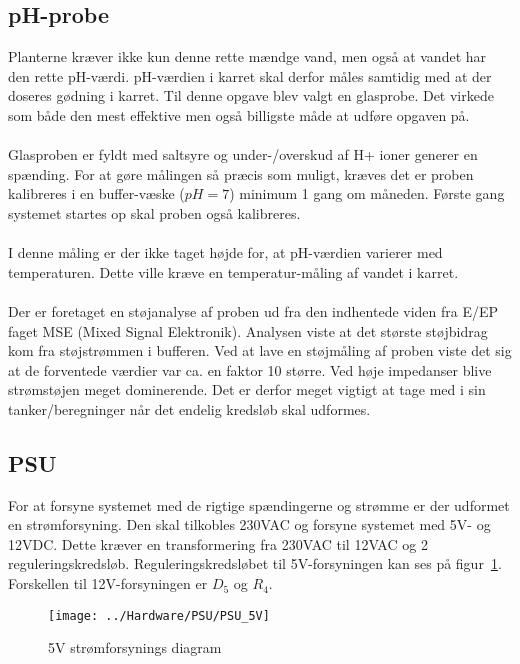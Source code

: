 \subsection{pH-probe}
Planterne kræver ikke kun denne rette mændge vand, men også at vandet har den rette pH-værdi. pH-værdien i karret skal derfor måles samtidig med at der doseres gødning i karret. Til denne opgave blev valgt en glasprobe. Det virkede som både den mest effektive men også billigste måde at udføre opgaven på.
\\\\
Glasproben er fyldt med saltsyre og under-/overskud af H+ ioner generer en spænding. For at gøre målingen så præcis som muligt, kræves det er proben kalibreres i en buffer-væske ($pH = 7$) minimum 1 gang om måneden. Første gang systemet startes op skal proben også kalibreres. 
\\\\
I denne måling er der ikke taget højde for, at pH-værdien varierer med temperaturen. Dette ville kræve en temperatur-måling af vandet i karret.
\\\\
Der er foretaget en støjanalyse af proben ud fra den indhentede viden fra E/EP faget MSE (Mixed Signal Elektronik). Analysen viste at det største støjbidrag kom fra støjstrømmen i bufferen. Ved at lave en støjmåling af proben viste det sig at de forventede værdier var ca. en faktor 10 større. Ved høje impedanser blive strømstøjen meget dominerende. Det er derfor meget vigtigt at tage med i sin tanker/beregninger når det endelig kredsløb skal udformes.

\subsection{PSU}
For at forsyne systemet med de rigtige spændingerne og strømme er der udformet en strømforsyning. Den skal tilkobles 230VAC og forsyne systemet med 5V- og 12VDC. Dette kræver en transformering fra 230VAC til 12VAC og 2 reguleringskredsløb. Reguleringskredsløbet til 5V-forsyningen kan ses på figur~\ref{photo:PSU_5V}. Forskellen til 12V-forsyningen er $D_5$ og $R_4$.
 
\begin{figure}[H]
	\centering
	\texttt{[image: ../Hardware/PSU/PSU\_5V]}
	\caption{5V strømforsynings diagram}
	\label{photo:PSU_5V}
\end{figure}

